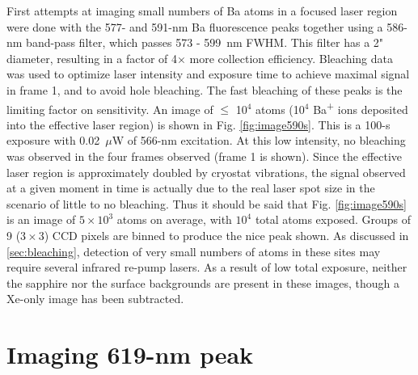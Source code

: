First attempts at imaging small numbers of Ba atoms in a focused laser region were done with the 577- and 591-nm Ba fluorescence peaks together using a 586-nm band-pass filter, which passes 573 - 599~nm FWHM.  This filter has a 2" diameter, resulting in a factor of 4$\times$ more collection efficiency.  Bleaching data was used to optimize laser intensity and exposure time to achieve maximal signal in frame 1, and to avoid hole bleaching.  The fast bleaching of these peaks is the limiting factor on sensitivity.  An image of $\leq$ 10$^{4}$ atoms (10$^{4}$ Ba\textsuperscript{+} ions deposited into the effective laser region) is shown in Fig. \ref{fig:image590s}.  This is a 100-s exposure with 0.02~$\mu$W of 566-nm excitation.  At this low intensity, no bleaching was observed in the four frames observed (frame 1 is shown).  Since the effective laser region is approximately doubled by cryostat vibrations, the signal observed at a given moment in time is actually due to the real laser spot size in the scenario of little to no bleaching.  Thus it should be said that Fig. \ref{fig:image590s} is an image of $5 \times 10^{3}$ atoms on average, with $10^{4}$ total atoms exposed.  Groups of 9 ($3 \times 3$) CCD pixels are binned to produce the nice peak shown.  As discussed in \ref{sec:bleaching}, detection of very small numbers of atoms in these sites may require several infrared re-pump lasers.  As a result of low total exposure, neither the sapphire nor the surface backgrounds are present in these images, though a Xe-only image has been subtracted. 

\section{Imaging 619-nm peak}

